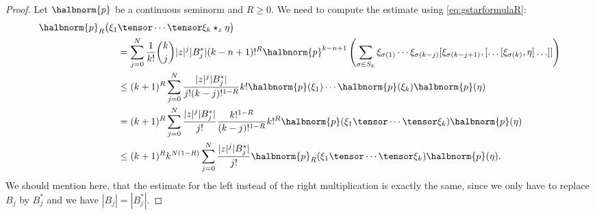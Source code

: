 \documentclass[
11pt,                          %
english                        %
]{article}
\begin{document}
\begin{proof}
	Let $\halbnorm{p}$ be a continuous seminorm and $R \geq 0$. We need to
	compute the estimate using \eqref{eq:gstarformulaR}:
	\begin{align*}
		\halbnorm{p}_R
		\big(
			\xi_1
		&	
			 \tensor \cdots \tensor \xi_k \star_z \eta
		\big)
		\\
		&=
	    \sum\limits_{j=0}^N
        \frac{1}{k!} \binom{k}{j}
        |z|^j |B_j^*|
        (k - n + 1)!^R
        \halbnorm{p}^{k - n + 1}
        \left(
            \sum\limits_{\sigma \in S_k}
            \xi_{\sigma(1)} \cdots \xi_{\sigma(k - j)}
            [\xi_{\sigma(k - j + 1)},
            [ \ldots [\xi_{\sigma(k)}, \eta] \ldots ]
            ]
        \right)
        \\
        & \leq
        (k + 1)^R
	    \sum\limits_{j=0}^N
        \frac{|z|^j |B_j^*|}{j! (k-j)!^{1-R}}
        k! 
        \halbnorm{p}(\xi_1) \cdots \halbnorm{p}(\xi_k)
        \halbnorm{p}(\eta)
        \\
        & =
        (k + 1)^R
	    \sum\limits_{j=0}^N
        \frac{|z|^j |B_j^*|}{j!}
        \frac{k!^{1 - R}}{(k-j)!^{1-R}}
        k!^R
        \halbnorm{p}(\xi_1 \tensor \cdots \tensor \xi_k)
        \halbnorm{p}(\eta)
        \\
        & \leq
        (k + 1)^R
        k^{N (1-R)}
	    \sum\limits_{j=0}^N
        \frac{|z|^j |B_j^*|}{j!}
        \halbnorm{p}_R(\xi_1 \tensor \cdots \tensor \xi_k)
        \halbnorm{p}(\eta).
	\end{align*}
	We should mention here, that the estimate for the left instead of the right
	multiplication is exactly the same, since we only have to replace $B_j$ by 
	$B_j^*$ and we have $|B_j| = |B_j^*|$.
	

\end{proof}
\end{document}

